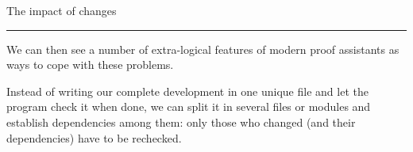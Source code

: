 \documentclass[12pt]{article} \usepackage{beamerarticle} \usepackage{fullpage}
\begin{document}
\begin{frame}{The impact of changes}
\begin{center}
  \end{center}
  \pause
\end{frame}
\hrule

We can then see a number of extra-logical features of modern proof
assistants as ways to cope with these problems. 

Instead of writing our complete development in one unique file and let
the program check it when done, we can split it in several files or
modules and establish dependencies among them: only those who changed
(and their dependencies) have to be rechecked.
\end{document}
